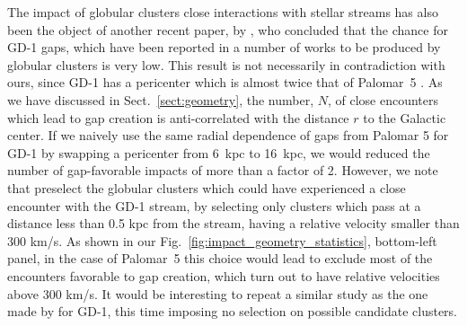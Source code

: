 \documentclass{aa}
\begin{document}
  The impact of globular clusters close interactions with stellar streams has also been the object of another recent paper, by \citet{2022ApJ...941..129D}, who concluded that the chance for GD-1 gaps, which have been reported in a number of works \citep[see, for example, ][]{2019ApJ...880...38B,2018MNRAS.477.1893D,2020AAS...23533607D} to be produced by globular clusters is very low. This result is not necessarily in contradiction with ours, since GD-1 has a pericenter which is almost twice that of Palomar~5 \citep[see, for example][]{2019MNRAS.486.2995M}. As we have discussed in Sect.~\ref{sect:geometry}, the number, $N$, of close encounters which lead to gap creation is anti-correlated with the distance $r$ to the Galactic center. If we naively use the same radial dependence of gaps from Palomar 5 for GD-1 by swapping a pericenter from 6~kpc to 16~kpc, we would reduced the number of gap-favorable impacts of more than a factor of 2. However, we note that \citet{2022ApJ...941..129D} preselect the globular clusters which could have experienced a close encounter with the GD-1 stream, by selecting only clusters which pass at a distance less than 0.5 kpc from the stream, having a relative velocity smaller than  300 km/s. As shown in our Fig.~\ref{fig:impact_geometry_statistics}, bottom-left panel, in the case of Palomar~5 this choice would lead to exclude most of the encounters favorable to gap creation, which turn out to have relative velocities above 300 km/s. It would be interesting to repeat a similar study as the one made by \citet{2022ApJ...941..129D} for GD-1, this time imposing no selection on possible candidate clusters.\\
  
\end{document}
